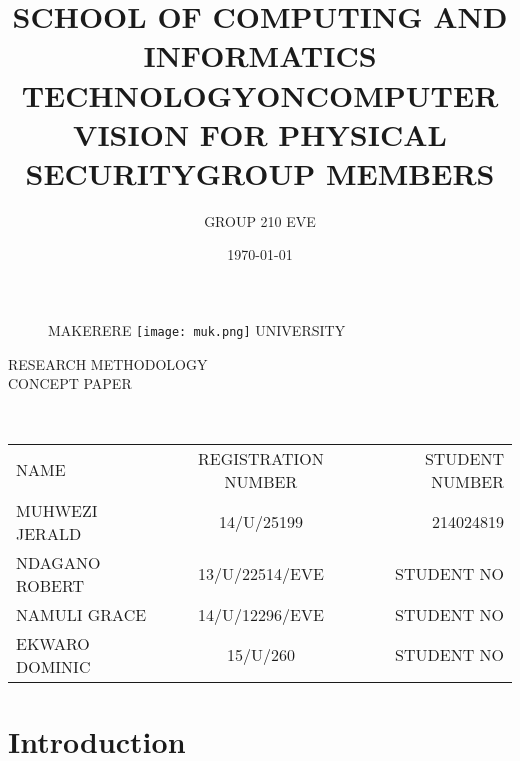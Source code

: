 \documentclass[11pt]{article}
\begin{document}
	
\title{SCHOOL OF COMPUTING AND INFORMATICS\\ TECHNOLOGY}
\author{GROUP 210 EVE}
\date{\today{}}
\begin{figure}
	\begin{center}
	\Huge MAKERERE \texttt{[image: muk.png]} \Huge UNIVERSITY
	\end{center}
\end{figure}
	\maketitle
	
	\begin{center}
	RESEARCH METHODOLOGY \\CONCEPT PAPER
	\end{center}
\begin{center}
	\title{ON}
\end{center}
	\begin{center}
		\title{COMPUTER VISION FOR PHYSICAL SECURITY}\\		 
	\end{center}

   \begin{center}
   	 \title{GROUP MEMBERS}
   	\begin{table}[!th]
   		\begin{tabular}{|l|c|r|}
   			\hline
   			NAME & REGISTRATION NUMBER & STUDENT NUMBER \\
   			MUHWEZI JERALD & 14/U/25199 & 214024819 \\
   			NDAGANO ROBERT & 13/U/22514/EVE & STUDENT NO \\
   			NAMULI GRACE & 14/U/12296/EVE & STUDENT NO \\
   			EKWARO DOMINIC & 15/U/260 & STUDENT NO \\
   			\hline
   		\end{tabular}
   	\end{table}
   \end{center}
     
	\newpage
	\section{ \textbf{Introduction} }
\end{document}
